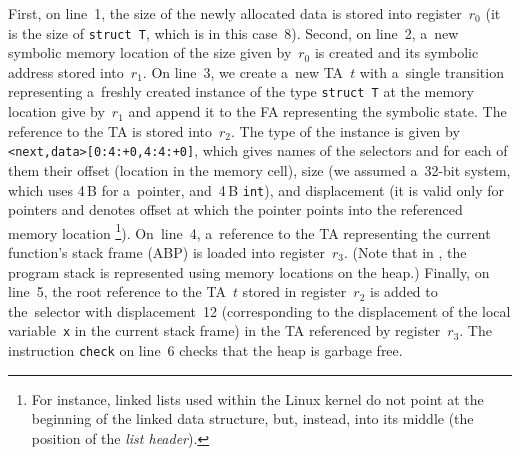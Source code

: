 {First, on line~1, the size of the newly allocated data is stored into
register~$r_0$ (it is the size of \texttt{struct~T}, which is in this case~8).
Second, on line~2, a~new symbolic memory location of the size given by~$r_0$ is created
and its symbolic address stored into~$r_1$.
On line~3, we create a~new TA~$t$ with a~single transition representing
a~freshly created instance of the type \texttt{struct~T} at the memory location
give by~$r_1$ and append it to the FA representing the symbolic state.
The reference to the TA is stored into~$r_2$.
The type of the instance is given by \verb=<next,data>[0:4:+0,4:4:+0]=, which
gives names of the selectors and for each of them their offset (location in the memory cell),
size (we assumed a~32-bit system, which uses 4\,B for a~pointer, and~4\,B
\texttt{int}), and displacement (it is valid only for pointers and denotes offset
at which the pointer points into the referenced memory location%
\footnote{%
For instance, linked lists used within the Linux kernel do not point at the
beginning of the linked data structure, but, instead, into its middle (the position of
the \emph{list header}).
}).
On~line~4, a~reference to the TA representing the current function's stack frame
(ABP) is loaded into register~$r_3$.
(Note that in \forester, the program stack is represented using memory locations
on the heap.)
Finally, on line~5, the root reference to the TA~$t$ stored in register~$r_2$ is
added to the~selector with displacement~12 (corresponding to the displacement of
the local variable~\texttt{x} in the current stack frame) in the TA referenced
by register~$r_3$.
The instruction \texttt{check} on line~6 checks that the heap is garbage free.



}
